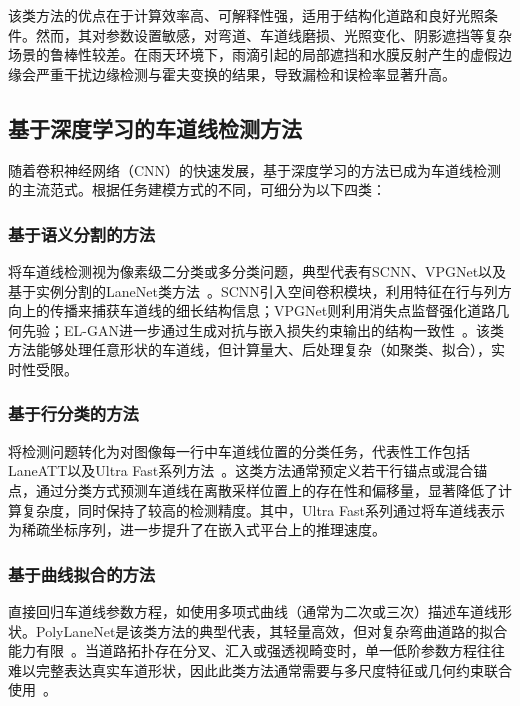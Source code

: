 该类方法的优点在于计算效率高、可解释性强，适用于结构化道路和良好光照条件。然而，其对参数设置敏感，对弯道、车道线磨损、光照变化、阴影遮挡等复杂场景的鲁棒性较差。在雨天环境下，雨滴引起的局部遮挡和水膜反射产生的虚假边缘会严重干扰边缘检测与霍夫变换的结果，导致漏检和误检率显著升高。

\subsection{基于深度学习的车道线检测方法}
随着卷积神经网络（CNN）的快速发展，基于深度学习的方法已成为车道线检测的主流范式。根据任务建模方式的不同，可细分为以下四类：

\subsubsection{基于语义分割的方法}
将车道线检测视为像素级二分类或多分类问题，典型代表有SCNN、VPGNet以及基于实例分割的LaneNet类方法~\cite{pan2018spatial,lee2017vpgnet,neven2018}。SCNN引入空间卷积模块，利用特征在行与列方向上的传播来捕获车道线的细长结构信息；VPGNet则利用消失点监督强化道路几何先验；EL-GAN进一步通过生成对抗与嵌入损失约束输出的结构一致性~\cite{ghafoorian2018elgan}。该类方法能够处理任意形状的车道线，但计算量大、后处理复杂（如聚类、拟合），实时性受限。

\subsubsection{基于行分类的方法}
将检测问题转化为对图像每一行中车道线位置的分类任务，代表性工作包括LaneATT以及Ultra Fast系列方法~\cite{tabellion2021laneatt,qin2020ultrafast,qin2024ultrafastv2}。这类方法通常预定义若干行锚点或混合锚点，通过分类方式预测车道线在离散采样位置上的存在性和偏移量，显著降低了计算复杂度，同时保持了较高的检测精度。其中，Ultra Fast系列通过将车道线表示为稀疏坐标序列，进一步提升了在嵌入式平台上的推理速度。

\subsubsection{基于曲线拟合的方法}
直接回归车道线参数方程，如使用多项式曲线（通常为二次或三次）描述车道线形状。PolyLaneNet是该类方法的典型代表，其轻量高效，但对复杂弯曲道路的拟合能力有限~\cite{tabellion2021keep}。当道路拓扑存在分叉、汇入或强透视畸变时，单一低阶参数方程往往难以完整表达真实车道形状，因此此类方法通常需要与多尺度特征或几何约束联合使用~\cite{garnett2019threedlanenet,chen2022persformer}。


